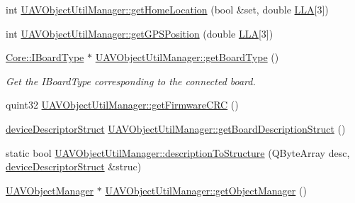 \begin{DoxyCompactItemize}
\item 
int \hyperlink{group___u_a_v_objects_plugin_gac5e7b38a473a50f709fb6312ef511e59}{\-U\-A\-V\-Object\-Util\-Manager\-::get\-Home\-Location} (bool \&set, double \hyperlink{_o_p_plots_8m_ac4d07718b2724e836be86fbe0c8c5704}{\-L\-L\-A}\mbox{[}3\mbox{]})
\item 
int \hyperlink{group___u_a_v_objects_plugin_gade02e26d0bb8afe69edff8a076882dcd}{\-U\-A\-V\-Object\-Util\-Manager\-::get\-G\-P\-S\-Position} (double \hyperlink{_o_p_plots_8m_ac4d07718b2724e836be86fbe0c8c5704}{\-L\-L\-A}\mbox{[}3\mbox{]})
\item 
\hyperlink{class_core_1_1_i_board_type}{\-Core\-::\-I\-Board\-Type} $\ast$ \hyperlink{group___u_a_v_objects_plugin_gac3a1293716fa3eb310ed257ade7f6722}{\-U\-A\-V\-Object\-Util\-Manager\-::get\-Board\-Type} ()
\begin{DoxyCompactList}\small\item\em \-Get the \-I\-Board\-Type corresponding to the connected board. \end{DoxyCompactList}\item 
quint32 \hyperlink{group___u_a_v_objects_plugin_ga2aa3a13d1eb39329f28842887c6d7db6}{\-U\-A\-V\-Object\-Util\-Manager\-::get\-Firmware\-C\-R\-C} ()
\item 
\hyperlink{classdevice_descriptor_struct}{device\-Descriptor\-Struct} \hyperlink{group___u_a_v_objects_plugin_ga37ed95a95ca8906a45b06bb7174b1158}{\-U\-A\-V\-Object\-Util\-Manager\-::get\-Board\-Description\-Struct} ()
\item 
static bool \hyperlink{group___u_a_v_objects_plugin_ga31c6b739ad7f06472a3f3386e4bebd8a}{\-U\-A\-V\-Object\-Util\-Manager\-::description\-To\-Structure} (\-Q\-Byte\-Array desc, \hyperlink{classdevice_descriptor_struct}{device\-Descriptor\-Struct} \&struc)
\item 
\hyperlink{class_u_a_v_object_manager}{\-U\-A\-V\-Object\-Manager} $\ast$ \hyperlink{group___u_a_v_objects_plugin_ga9a99c93b8210149fd59246e2648a9c59}{\-U\-A\-V\-Object\-Util\-Manager\-::get\-Object\-Manager} ()
\end{DoxyCompactItemize}
